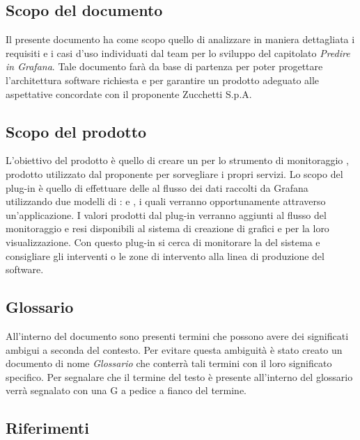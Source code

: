 \documentclass[../analisi-dei-requisiti.tex]{subfiles}
\begin{document}
\subsection{Scopo del documento}%
\label{subs:scopo_del_documento}
Il presente documento ha come scopo quello di analizzare in maniera dettagliata i requisiti e i casi d'uso individuati dal team per lo sviluppo del capitolato \emph{Predire in Grafana}. Tale documento farà da base di partenza per poter progettare l'architettura software richiesta e per garantire un prodotto adeguato alle aspettative concordate con il proponente Zucchetti S.p.A.

\subsection{Scopo del prodotto}%
\label{subs:scopo_del_prodotto}
L'obiettivo del prodotto è quello di creare un  per lo strumento di monitoraggio , prodotto utilizzato dal proponente per sorvegliare i propri servizi. Lo scopo del plug-in è quello di effettuare delle  al flusso dei dati raccolti da Grafana utilizzando due modelli di :  e , i quali verranno opportunamente  attraverso un'applicazione. I valori prodotti dal plug-in verranno aggiunti al flusso del monitoraggio e resi disponibili al sistema di creazione di grafici e  per la loro visualizzazione. Con questo plug-in si cerca di monitorare la  del sistema e consigliare gli interventi o le zone di intervento alla linea di produzione del software.

\subsection{Glossario}
\label{subs:glossario}
All'interno del documento sono presenti termini che possono avere dei significati ambigui a seconda del contesto. Per evitare questa ambiguità è stato creato un documento di nome  \textit{Glossario} che conterrà tali termini con il loro significato specifico. Per segnalare che il termine del testo è presente all'interno del glossario verrà segnalato con una G a pedice a fianco del termine.

\subsection{Riferimenti}
\label{subs:riferimenti}
\end{document}
